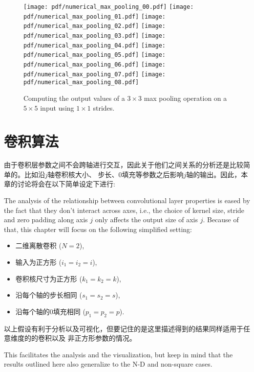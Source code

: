 \documentclass[notitlepage]{report}
\begin{document}
\begin{figure}[p]
    \centering
    \texttt{[image: pdf/numerical\_max\_pooling\_00.pdf]}
    \texttt{[image: pdf/numerical\_max\_pooling\_01.pdf]}
    \texttt{[image: pdf/numerical\_max\_pooling\_02.pdf]}
    \texttt{[image: pdf/numerical\_max\_pooling\_03.pdf]}
    \texttt{[image: pdf/numerical\_max\_pooling\_04.pdf]}
    \texttt{[image: pdf/numerical\_max\_pooling\_05.pdf]}
    \texttt{[image: pdf/numerical\_max\_pooling\_06.pdf]}
    \texttt{[image: pdf/numerical\_max\_pooling\_07.pdf]}
    \texttt{[image: pdf/numerical\_max\_pooling\_08.pdf]}
    \caption{\label{fig:numerical_max_pooling} Computing the output values of a
        $3 \times 3$ max pooling operation on a $5 \times 5$ input using $1
        \times 1$ strides.}
\end{figure}

\chapter{卷积算法}

由于卷积层参数之间不会跨轴进行交互，因此关于他们之间关系的分析还是比较简单的。比如沿$j$轴卷积核大小、
步长、0填充等参数之后影响$j$轴的输出。因此，本章的讨论将会在以下简单设定下进行:

The analysis of the relationship between convolutional layer properties is eased
by the fact that they don't interact across axes, i.e., the choice of kernel
size, stride and zero padding along axis $j$ only affects the output size of
axis $j$. Because of that, this chapter will focus on the following simplified
setting:

\begin{itemize}
    \item 二维离散卷积 ($N = 2$),
    \item 输入为正方形 ($i_1 = i_2 = i$),
    \item 卷积核尺寸为正方形 ($k_1 = k_2 = k$),
    \item 沿每个轴的步长相同 ($s_1 = s_2 = s$),
    \item 沿每个轴的0填充相同 ($p_1 = p_2 = p$).
\end{itemize}

以上假设有利于分析以及可视化，但要记住的是这里描述得到的结果同样适用于任意维度的的卷积以及
非正方形参数的情况。

This facilitates the analysis and the visualization, but keep in mind that the
results outlined here also generalize to the N-D and non-square cases.
\end{document}

